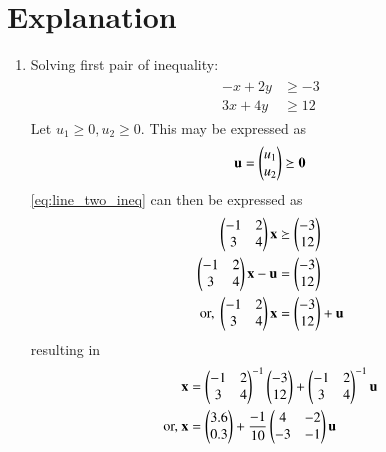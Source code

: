 \documentclass[journal,12pt,twocolumn]{IEEEtran}
\begin{document}
\section{Explanation}
\begin{enumerate}
    \item Solving first pair of inequality:
    \begin{align}
\label{eq:line_two_ineq}
\begin{split}
    -x+2y &\geq -3
\\
    3x+4y &\geq 12
\end{split}
\end{align}
\solution  Let $u_1 \ge 0, u_2 \ge 0$.  This may be expressed as
\begin{align}
\mathbf{u} = \begin{pmatrix}u_1\\u_2\end{pmatrix}\succeq \mathbf{0}
\end{align}
%
\eqref{eq:line_two_ineq} can then be expressed as
\begin{align}
\begin{pmatrix}-1 & 2 \\ 3 & 4\end{pmatrix}\mathbf{x}  &\succeq \begin{pmatrix}-3\\12\end{pmatrix}
\\
\begin{pmatrix}-1 & 2 \\ 3 & 4\end{pmatrix}\mathbf{x}  -\mathbf{u}&=\begin{pmatrix}-3\\12\end{pmatrix}
\\
\text{or, }
\begin{pmatrix}-1 & 2 \\ 3 & 4\end{pmatrix}\mathbf{x} &= \begin{pmatrix}-3\\12\end{pmatrix} +\mathbf{u}
\end{align}
%
resulting in 
\begin{align}
\mathbf{x} &= \begin{pmatrix}-1 & 2 \\ 3 & 4\end{pmatrix}^{-1}\begin{pmatrix}-3\\12\end{pmatrix} +\begin{pmatrix}-1 & 2 \\ 3 & 4\end{pmatrix}^{-1}\mathbf{u}
\\
\text{or, } \mathbf{x} &= \begin{pmatrix}3.6\\0.3\end{pmatrix} +\frac{-1}{10}\begin{pmatrix}4 & -2 \\ -3 & -1\end{pmatrix}\mathbf{u}\label{eq:1}
\end{align}
    

\end{enumerate}
\end{document}
